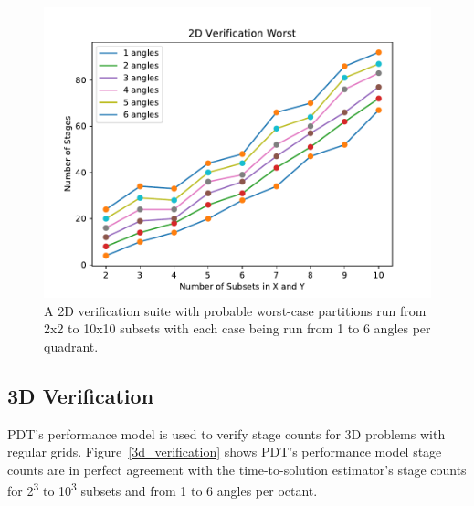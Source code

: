 \documentclass[times,final]{elsarticle}
\begin{document}
\begin{figure}[H]
\centering
\includegraphics[scale=0.8]{../figures/worst_verification.pdf}
\caption{A 2D verification suite with probable worst-case partitions run from 2x2 to 10x10 subsets with each case being run from 1 to 6 angles per quadrant.}
\label{worst_verification}
\end{figure}

\subsection{3D Verification}
PDT's performance model is used to verify stage counts for 3D problems with regular grids.
Figure~\ref{3d_verification} shows PDT's performance model stage counts are in perfect agreement with the time-to-solution estimator's stage counts for 2\textsuperscript{3} to 10\textsuperscript{3} subsets and from 1 to 6 angles per octant.
\end{document}
